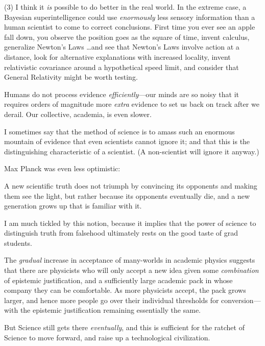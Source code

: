 {
 (3) I think it \textit{is} possible to do better in the real
world. In the extreme case, a Bayesian superintelligence could use
\textit{enormously} less sensory information than a human scientist to
come to correct conclusions. First time you ever see an apple fall
down, you observe the position goes as the square of time, invent
calculus, generalize Newton's Laws \ldots and see that
Newton's Laws involve action at a distance, look for
alternative explanations with increased locality, invent relativistic
covariance around a hypothetical speed limit, and consider that General
Relativity might be worth testing.}

{
 Humans do not process evidence \textit{efficiently}{}---our minds
are so noisy that it requires orders of magnitude more \textit{extra}
evidence to set us back on track after we derail. Our collective,
academia, is even slower.}

\myendsectiontext


\bigskip


{
 I sometimes say that the method of science is to amass such an
enormous mountain of evidence that even scientists cannot ignore it;
and that this is the distinguishing characteristic of a scientist. (A
non-scientist will ignore it anyway.) }

{
 Max Planck was even less optimistic:}

{
 A new scientific truth does not triumph by convincing its
opponents and making them see the light, but rather because its
opponents eventually die, and a new generation grows up that is
familiar with it.}

{
 I am much tickled by this notion, because it implies that the
power of science to distinguish truth from falsehood ultimately rests
on the good taste of grad students.}

{
 The \textit{gradual} increase in acceptance of many-worlds in
academic physics suggests that there are physicists who will only
accept a new idea given some \textit{combination} of epistemic
justification, and a sufficiently large academic pack in whose company
they can be comfortable. As more physicists accept, the pack grows
larger, and hence more people go over their individual thresholds for
conversion---with the epistemic justification remaining essentially the
same.}

{
 But Science still gets there \textit{eventually}, and this is
sufficient for the ratchet of Science to move forward, and raise up a
technological civilization.}

